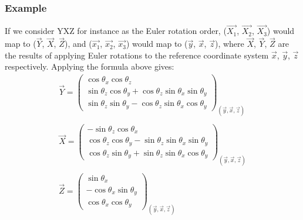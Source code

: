 \subsubsection{Example}
If we consider YXZ for instance as the Euler rotation order, ($\overrightarrow{X_{1}}$, $\overrightarrow{X_{2}}$, $\overrightarrow{X_{3}}$) would map to ($\overrightarrow{Y}$, $\overrightarrow{X}$, $\overrightarrow{Z}$), and ($\overrightarrow{x_{1}}$, $\overrightarrow{x_{2}}$, $\overrightarrow{x_{3}}$) would map to ($\overrightarrow{y}$, $\overrightarrow{x}$, $\overrightarrow{z}$), where $\overrightarrow{X}$, $\overrightarrow{Y}$, $\overrightarrow{Z}$ are the results of applying Euler rotations to the reference coordinate system $\overrightarrow{x}$, $\overrightarrow{y}$, $\overrightarrow{z}$ respectively. Applying the formula above gives:
\[
\begin{array}{lllll}
\overrightarrow{Y} = \begin{pmatrix}
\cos{\theta_{x}}  \cos{\theta_{z}} \\
\sin{\theta_{z}}  \cos{\theta_{y}} + \cos{\theta_{z}}  \sin{\theta_{x}}  \sin{\theta_{y}}\\
\sin{\theta_{z}}  \sin{\theta_{y}} - \cos{\theta_{z}}  \sin{\theta_{x}}  \cos{\theta_{y}}
\end{pmatrix}_{(\overrightarrow{y}, \overrightarrow{x}, \overrightarrow{z})}\\ \\

\overrightarrow{X} = \begin{pmatrix}
-\sin{\theta_{z}}  \cos{\theta_{x}} \\
\cos{\theta_{z}}  \cos{\theta_{y}} - \sin{\theta_{z}}  \sin{\theta_{x}}  \sin{\theta_{y}}\\
\cos{\theta_{z}}  \sin{\theta_{y}} + \sin{\theta_{z}}  \sin{\theta_{x}}  \cos{\theta_{y}}
\end{pmatrix}_{(\overrightarrow{y}, \overrightarrow{x}, \overrightarrow{z})}\\ \\

\overrightarrow{Z} = \begin{pmatrix}
\sin{\theta_{x}}\\
-\cos{\theta_{x}}  \sin{\theta_{y}}\\
\cos{\theta_{x}}  \cos{\theta_{y}}
\end{pmatrix}_{(\overrightarrow{y}, \overrightarrow{x}, \overrightarrow{z})}
\end{array}
\]\\

